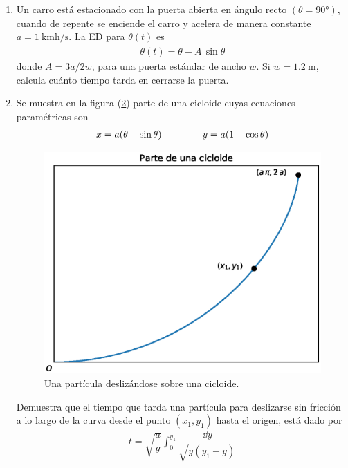 \begin{enumerate}
\begin{figure}[!ht]
    \label{fig:figura_01}
\end{figure}
\item Un carro está estacionado con la puerta abierta en ángulo recto $(\theta = \ang{90})$, cuando de repente se enciende el carro y acelera de manera constante $a = \SI{1}{\kilo\meter\hour\per\second}$. La ED para $\theta(t)$ es
\begin{align*}
\theta (t) =  \ddot{\theta} - A \, \sin \theta
\end{align*}
donde $A = 3a/2w$, para una puerta estándar de ancho $w$. Si $w = \SI{1.2}{\meter}$, calcula cuánto tiempo tarda en cerrarse la puerta.
\item Se muestra en la figura (\ref{fig:figura_02}) parte de una cicloide cuyas ecuaciones paramétricas son
\begin{align*}
x = a (\theta + \sin \theta) \hspace{1.5cm} y = a (1 - \cos \theta)
\end{align*}
\begin{figure}[H]
    \centering
    \includegraphics[scale=0.7]{Imagenes/plot_cicloide.eps}
    \caption{Una partícula deslizándose sobre una cicloide.}
    \label{fig:figura_02}
\end{figure}
Demuestra que el tiempo que tarda una partícula para deslizarse sin fricción a lo largo de la curva desde el punto $(x_{1}, y_{1})$ hasta el origen, está dado por
\begin{align*}
t = \sqrt{\dfrac{a}{g}} \int_{0}^{y_{1}} \dfrac{\dd{y}}{\sqrt{y (y_{1}- y)}}
\end{align*}

\end{enumerate}
